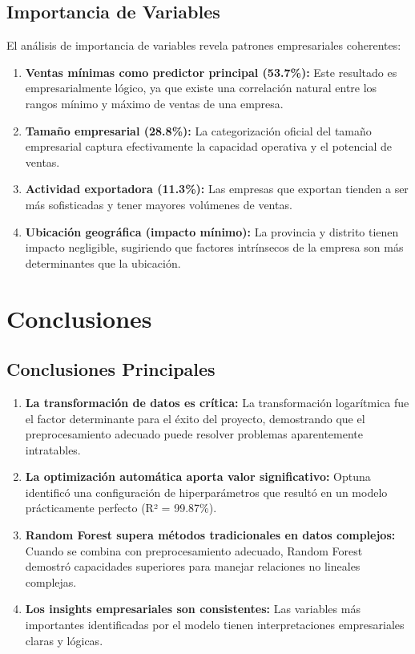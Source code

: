 \documentclass[12pt,a4paper]{article}
\begin{document}
\subsection{Importancia de Variables}

El análisis de importancia de variables revela patrones empresariales coherentes:

\begin{enumerate}
    \item \textbf{Ventas mínimas como predictor principal (53.7\%):} Este resultado es empresarialmente lógico, ya que existe una correlación natural entre los rangos mínimo y máximo de ventas de una empresa.
    
    \item \textbf{Tamaño empresarial (28.8\%):} La categorización oficial del tamaño empresarial captura efectivamente la capacidad operativa y el potencial de ventas.
    
    \item \textbf{Actividad exportadora (11.3\%):} Las empresas que exportan tienden a ser más sofisticadas y tener mayores volúmenes de ventas.
    
    \item \textbf{Ubicación geográfica (impacto mínimo):} La provincia y distrito tienen impacto negligible, sugiriendo que factores intrínsecos de la empresa son más determinantes que la ubicación.
\end{enumerate}


\section{Conclusiones}

\subsection{Conclusiones Principales}

\begin{enumerate}
    \item \textbf{La transformación de datos es crítica:} La transformación logarítmica fue el factor determinante para el éxito del proyecto, demostrando que el preprocesamiento adecuado puede resolver problemas aparentemente intratables.
    
    \item \textbf{La optimización automática aporta valor significativo:} Optuna identificó una configuración de hiperparámetros que resultó en un modelo prácticamente perfecto (R² = 99.87\%).
    
    \item \textbf{Random Forest supera métodos tradicionales en datos complejos:} Cuando se combina con preprocesamiento adecuado, Random Forest demostró capacidades superiores para manejar relaciones no lineales complejas.
    
    \item \textbf{Los insights empresariales son consistentes:} Las variables más importantes identificadas por el modelo tienen interpretaciones empresariales claras y lógicas.
\end{enumerate}
\end{document}
